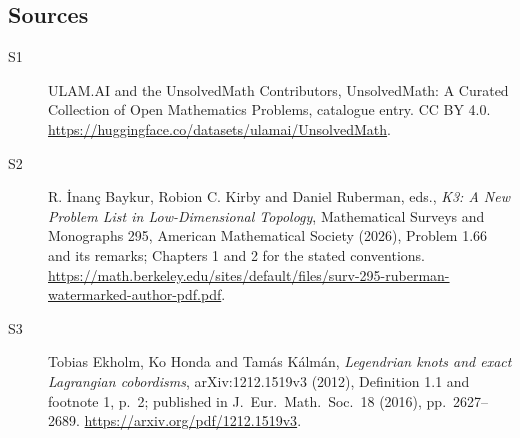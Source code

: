 \documentclass[11pt]{article}
\begin{document}
\subsection{Sources}
\begin{description}
\item[\hypertarget{source:statement:1}{S1}] ULAM.AI and the UnsolvedMath Contributors, UnsolvedMath: A Curated Collection of Open Mathematics Problems, catalogue entry. CC BY 4.0. \url{https://huggingface.co/datasets/ulamai/UnsolvedMath}.
\item[\hypertarget{source:statement:2}{S2}] R. İnanç Baykur, Robion C. Kirby and Daniel Ruberman, eds., \emph{K3: A New Problem List in Low-Dimensional Topology}, Mathematical Surveys and Monographs 295, American Mathematical Society (2026), Problem 1.66 and its remarks; Chapters 1 and 2 for the stated conventions. \url{https://math.berkeley.edu/sites/default/files/surv-295-ruberman-watermarked-author-pdf.pdf}.
\item[\hypertarget{source:statement:3}{S3}] Tobias Ekholm, Ko Honda and Tamás Kálmán, \emph{Legendrian knots and exact Lagrangian cobordisms}, arXiv:1212.1519v3 (2012), Definition 1.1 and footnote 1, p.\ 2; published in J.\ Eur.\ Math.\ Soc.\ 18 (2016), pp.\ 2627--2689. \url{https://arxiv.org/pdf/1212.1519v3}.
\end{description}
\label{end:statement}
\end{document}
